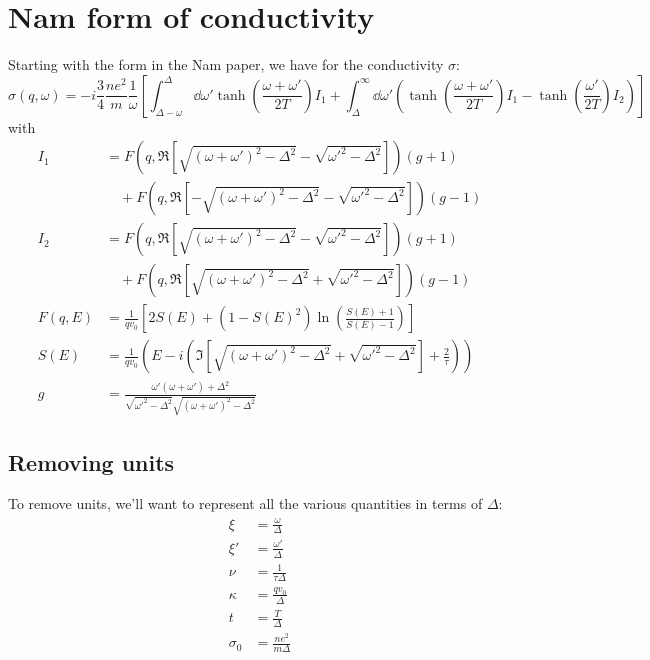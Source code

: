 \documentclass[../../main.tex]{subfiles}
\begin{document}
\section{Nam form of conductivity} \label{sec:NamForm}

Starting with the form in the Nam paper, we have for the conductivity $\sigma$:
\begin{equation}
\sigma(q, \omega) = -i \frac34\frac{ n e^2}{ m} \frac{1}{\omega}\left[\int_{\Delta - \omega}^{\Delta}\dd{\omega'} \tanh(\frac{\omega + \omega'}{2T}) I_1 + \int_{\Delta}^{\infty} \dd{\omega'} \left( \tanh(\frac{\omega + \omega'}{2T}) I_1  - \tanh(\frac{\omega'}{2T})I_2 \right) \right]
\end{equation}
with 
\begin{align}
I_1 &= F(q, \Re[\sqrt{(\omega + \omega')^2 - \Delta^2} - \sqrt{\omega'^2 - \Delta^2}]) (g + 1) \nonumber\\
&\quad + F(q, \Re[-\sqrt{(\omega + \omega')^2 - \Delta^2} - \sqrt{\omega'^2 - \Delta^2}]) (g - 1) \\
I_2 &= F(q, \Re[\sqrt{(\omega + \omega')^2 - \Delta^2} - \sqrt{\omega'^2 - \Delta^2}]) (g + 1) \nonumber\\
&\quad + F(q, \Re[\sqrt{(\omega + \omega')^2 - \Delta^2} + \sqrt{\omega'^2 - \Delta^2}]) (g - 1) \\
F(q, E) &= \frac{1}{q v_0} \left[2S(E) + (1 - S(E)^2)\ln(\frac{S(E) + 1}{S(E) - 1})\right]  \\
S(E) &= \frac{1}{q v_0} \left(E - i \left( \Im[\sqrt{(\omega + \omega')^2 - \Delta^2} +\sqrt{\omega'^2 - \Delta^2}] + \frac{2}{\tau} \right) \right) \\
g  &= \frac{\omega' \left( \omega + \omega'\right) + \Delta^2}{\sqrt{\omega'^2 - \Delta^2}\sqrt{(\omega + \omega')^2 - \Delta^2}}
\end{align}

\subsection{Removing units} \label{subsec:NamForm.Dimensionless}

To remove units, we'll want to represent all the various quantities in terms of $\Delta$:
\begin{align}
\xi &= \frac{\omega}{\Delta} \\
\xi' &= \frac{\omega'}{\Delta} \\
\nu &= \frac{1}{\tau \Delta} \\
\kappa &= \frac{q v_0}{\Delta} \\
t &= \frac{T}{\Delta} \\
\sigma_0 &= \frac{n e^2}{m \Delta}
\end{align}
\end{document}
